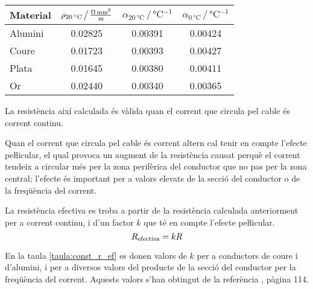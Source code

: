 \begin{center}
   \label{taula:param-elc}
   \begin{tabular}{lccc}
   \toprule[1pt]
   Material & $\rho_{\qty{20}{\degreeCelsius}} \,\big/\, \unit[per-mode = fraction]{\ohm\milli\metre\squared\per\metre}$ & $\alpha_{\qty{20}{\degreeCelsius}} \,\big/\, \unit{\degreeCelsius^{-1}}$ &
   $\alpha_{\qty{0}{\degreeCelsius}} \,\big/\, \unit{\degreeCelsius^{-1}}$
   \\
   \midrule
      Alumini & \num{0,02825} & \num{0,00391} & \num{0,00424} \\
      Coure   & \num{0,01723} & \num{0,00393} & \num{0,00427} \\
      Plata   & \num{0,01645} & \num{0,00380} & \num{0,00411} \\
      Or      & \num{0.02440} & \num{0.00340} & \num{0,00365} \\
   \bottomrule[1pt]
   \end{tabular}
\end{center}

La resistència així calculada és vàlida quan el corrent que circula
pel cable és corrent continu.

Quan el corrent que circula pel cable és
corrent altern cal tenir en compte l'efecte peŀlicular, el qual
 provoca un augment de la resistència causat perquè el corrent
tendeix a circular més per la zona perifèrica del conductor que no pas per
la zona central; l'efecte és important per a valors elevats de la
secció del conductor o de la freqüència del corrent.

La resistència efectiva es troba a
partir de la resistència calculada anteriorment per a corrent
continu, i d'un factor $k$ que té en compte l'efecte peŀlicular.
\begin{equation}
   R_\mathrm{efectiva} = k R
\end{equation}

En la taula \vref{taula:const_r_ef} es donen valors de $k$ per a conductors de coure i d'alumini, i per a diversos valors del producte de la secció del conductor per la freqüència del corrent. Aquests valors s'han obtingut de la  referència \cite{RASa}, pàgina 114.

